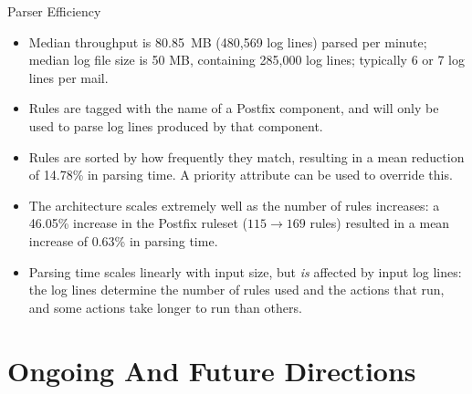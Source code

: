 \documentclass{beamer}
\newcommand{\timingnote}[1]{%
}
\begin{document}
\begin{frame}{Parser Efficiency}

    \timingnote{2 minutes}

    \begin{itemize}

        \item Median throughput is 80.85~MB (480,569 log lines) parsed per
            minute; median log file size is 50 MB, containing 285,000 log
            lines; typically 6 or 7 log lines per mail.

        \item Rules are tagged with the name of a Postfix component, and
            will only be used to parse log lines produced by that
            component.

        \item Rules are sorted by how frequently they match, resulting in a
            mean reduction of 14.78\% in parsing time.  A priority
            attribute can be used to override this.  \timingnote{change in
            ordering is informative.  Described in paper}

        \item The architecture scales extremely well as the number of rules
            increases: a 46.05\% increase in the Postfix ruleset ($115
            \rightarrow{} 169$ rules) resulted in a mean increase of 0.63\%
            in parsing time.  \timingnote{less than 2/3 of 1\%; 2 orders of
            magnitude}

        \item Parsing time scales linearly with input size, but
            \textit{is\/} affected by input log lines: the log lines
            determine the number of rules used and the actions that run,
            and some actions take longer to run than others.

    \end{itemize}

\end{frame}

\section{Ongoing And Future Directions}
\end{document}
